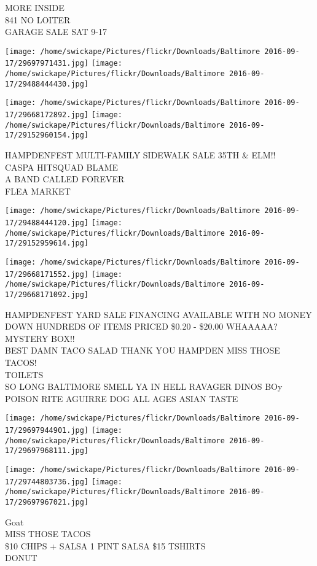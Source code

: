 \documentclass[10pt,letterpaper]{article}
\begin{document}
MORE INSIDE\\
841 NO LOITER\\
GARAGE SALE SAT 9{-}17
\pagebreak

\texttt{[image: /home/swickape/Pictures/flickr/Downloads/Baltimore 2016-09-17/29697971431.jpg]}
\texttt{[image: /home/swickape/Pictures/flickr/Downloads/Baltimore 2016-09-17/29488444430.jpg]}

\texttt{[image: /home/swickape/Pictures/flickr/Downloads/Baltimore 2016-09-17/29668172892.jpg]}
\texttt{[image: /home/swickape/Pictures/flickr/Downloads/Baltimore 2016-09-17/29152960154.jpg]}

HAMPDENFEST MULTI{-}FAMILY SIDEWALK SALE 35TH \& ELM!!\\
CASPA HITSQUAD BLAME\\
A BAND CALLED FOREVER\\
FLEA MARKET
\pagebreak

\texttt{[image: /home/swickape/Pictures/flickr/Downloads/Baltimore 2016-09-17/29488444120.jpg]}
\texttt{[image: /home/swickape/Pictures/flickr/Downloads/Baltimore 2016-09-17/29152959614.jpg]}

\texttt{[image: /home/swickape/Pictures/flickr/Downloads/Baltimore 2016-09-17/29668171552.jpg]}
\texttt{[image: /home/swickape/Pictures/flickr/Downloads/Baltimore 2016-09-17/29668171092.jpg]}

HAMPDENFEST YARD SALE FINANCING AVAILABLE WITH NO MONEY DOWN HUNDREDS OF ITEMS PRICED \$0.20 {-} \$20.00 WHAAAAA?  MYSTERY BOX!!\\
BEST DAMN TACO SALAD THANK YOU HAMPDEN MISS THOSE TACOS!\\
TOILETS\\
SO LONG BALTIMORE SMELL YA IN HELL RAVAGER DINOS BOy POISON RITE AGUIRRE DOG ALL AGES ASIAN TASTE
\pagebreak

\texttt{[image: /home/swickape/Pictures/flickr/Downloads/Baltimore 2016-09-17/29697944901.jpg]}
\texttt{[image: /home/swickape/Pictures/flickr/Downloads/Baltimore 2016-09-17/29697968111.jpg]}

\texttt{[image: /home/swickape/Pictures/flickr/Downloads/Baltimore 2016-09-17/29744803736.jpg]}
\texttt{[image: /home/swickape/Pictures/flickr/Downloads/Baltimore 2016-09-17/29697967021.jpg]}

Goat\\
MISS THOSE TACOS\\
\$10 CHIPS + SALSA 1 PINT SALSA \$15 TSHIRTS\\
DONUT
\pagebreak
\end{document}
